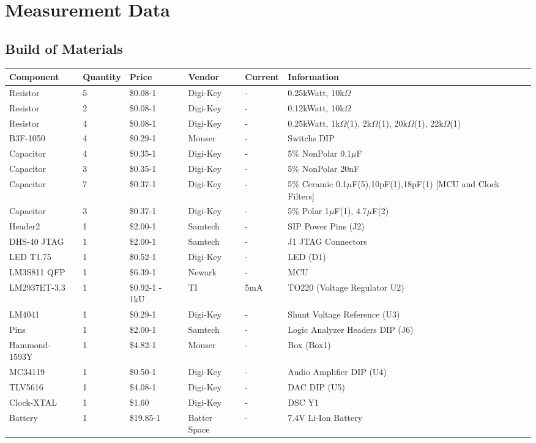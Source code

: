 \documentclass[twoside]{article}
\begin{document}
\section*{Measurement Data}
\subsection*{Build of Materials}
\begin{center}
  \begin{tabularx}{\textwidth}{ | p{} | p{} | p{} | p{} | p{} | p{} | }
    \hline
    Component & Quantity & Price & Vendor & Current & Information \\ \hline
    Resistor & 5 & \$0.08-1 & Digi-Key & - & 0.25kWatt, 10k$\Omega$ \\ \hline
    Resistor & 2 & \$0.08-1 & Digi-Key & - & 0.12kWatt, 10k$\Omega$ \\ \hline
    Resistor & 4 & \$0.08-1 & Digi-Key & - & 0.25kWatt, 1k$\Omega$(1), 2k$\Omega$(1), 20k$\Omega$(1), 22k$\Omega$(1) \\ \hline
    B3F-1050 & 4 & \$0.29-1 & Mouser & - & Switchs DIP \\ \hline
    Capacitor & 4 & \$0.35-1 & Digi-Key & - & 5\% NonPolar 0.1$\mu$F \\ \hline
    Capacitor & 3 & \$0.35-1 & Digi-Key & - & 5\% NonPolar 20nF \\ \hline
    Capacitor & 7 & \$0.37-1 & Digi-Key & - & 5\% Ceramic  0.1$\mu$F(5),10pF(1),18pF(1) [MCU and Clock Filters]\\ \hline
    Capacitor & 3 & \$0.37-1 & Digi-Key & - & 5\% Polar 1$\mu$F(1), 4.7$\mu$F(2) \\ \hline
    Header2 & 1 & \$2.00-1 & Samtech & - & SIP Power Pins (J2) \\ \hline
    DHS-40 JTAG & 1 & \$2.00-1 & Samtech & - & J1 JTAG Connectors \\ \hline
    LED T1.75 & 1 & \$0.52-1 & Digi-Key & - & LED (D1) \\ \hline
    LM3S811 QFP & 1 & \$6.39-1 & Newark & - & MCU \\ \hline
    LM2937ET-3.3 & 1 & \$0.92-1 - 1kU & TI & 5mA & TO220 (Voltage Regulator U2) \\ \hline
    LM4041 & 1 & \$0.29-1 & Digi-Key & - & Shunt Voltage Reference (U3) \\ \hline
    Pins & 1 & \$2.00-1 & Samtech & - & Logic Analyzer Headers DIP (J6) \\ \hline
    Hammond-1593Y & 1 & \$4.82-1 & Mouser & - & Box (Box1) \\ \hline
    MC34119 & 1 & \$0.50-1 & Digi-Key & - & Audio Amplifier DIP (U4) \\ \hline
    TLV5616 & 1 & \$4.08-1 & Digi-Key & - & DAC DIP (U5) \\ \hline
    Clock-XTAL & 1 & \$1.60 & Digi-Key & - & DSC Y1 \\ \hline   
    Battery & 1 & \$19.85-1 & Batter Space & - & 7.4V Li-Ion Battery \\ \hline
  \end{tabularx}
\end{center}
\end{document}
